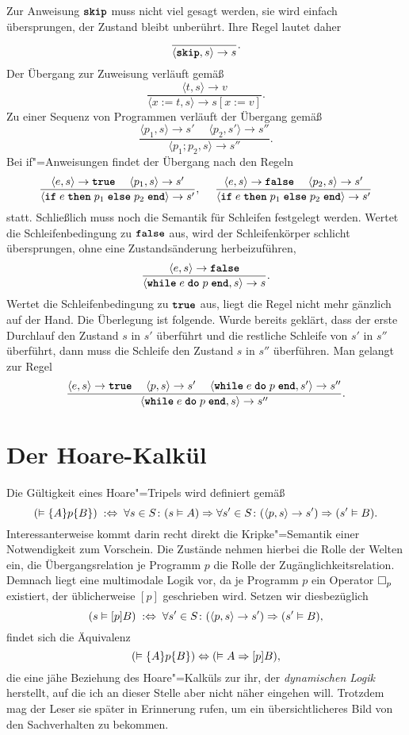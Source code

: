 Zur Anweisung $\kw{skip}$ muss nicht viel gesagt werden, sie wird einfach
übersprungen, der Zustand bleibt unberührt. Ihre Regel lautet daher
\[\dfrac{}{\langle\kw{skip},s\rangle\to s}.\]
Der Übergang zur Zuweisung verläuft gemäß
\[\dfrac{\langle t,s\rangle\to v}{\langle x:=t, s\rangle \to s[x:=v]}.\]
Zu einer Sequenz von Programmen verläuft der Übergang gemäß
\[\dfrac{\langle p_1,s\rangle\to s'\quad\;\langle p_2,s'\rangle\to s''}
{\langle p_1; p_2, s\rangle\to s''}.\]
Bei if"=Anweisungen findet der Übergang nach den Regeln
\[\dfrac{\langle e,s\rangle\to\kw{true}\quad\;\langle p_1,s\rangle\to s'}
{\langle\kw{if}\;e\;\kw{then}\;p_1\;\kw{else}\;p_2\;\kw{end}\rangle\to s'},\quad\;
\dfrac{\langle e,s\rangle\to\kw{false}\quad\;\langle p_2,s\rangle\to s'}
{\langle\kw{if}\;e\;\kw{then}\;p_1\;\kw{else}\;p_2\;\kw{end}\rangle\to s'}\]
statt. Schließlich muss noch die Semantik für Schleifen festgelegt werden.
Wertet die Schleifenbedingung zu $\kw{false}$ aus, wird der Schleifenkörper
schlicht übersprungen, ohne eine Zustandsänderung herbeizuführen,
\[\dfrac{\langle e,s\rangle\to\kw{false}}
{\langle\kw{while}\;e\;\kw{do}\;p\;\kw{end},s\rangle\to s}.\]
Wertet die Schleifenbedingung zu $\kw{true}$ aus, liegt die Regel
nicht mehr gänzlich auf der Hand. Die Überlegung ist folgende. Wurde
bereits geklärt, dass der erste Durchlauf den Zustand $s$ in $s'$
überführt und die restliche Schleife von $s'$ in $s''$ überführt,
dann muss die Schleife den Zustand $s$ in $s''$ überführen. Man gelangt
zur Regel
\[\dfrac{\langle e,s\rangle\to\kw{true}\quad\;\langle p,s\rangle\to s'\quad\;
\langle\kw{while}\;e\;\kw{do}\;p\;\kw{end},s'\rangle\to s''}
{\langle\kw{while}\;e\;\kw{do}\;p\;\kw{end},s\rangle\to s''}.\]

\section{Der Hoare-Kalkül}

Die Gültigkeit eines Hoare"=Tripels wird definiert gemäß
\[(\vDash\{A\}p\{B\})\;:\Leftrightarrow\;\forall s\in S\colon (s\vDash A)\Rightarrow\forall s'\in S\colon
(\langle p,s\rangle\to s')\Rightarrow (s'\vDash B).\]
Interessanterweise kommt darin recht direkt die Kripke"=Semantik einer
Notwendigkeit zum Vorschein. Die Zustände nehmen hierbei die Rolle der
Welten ein, die Übergangsrelation je Programm $p$ die Rolle der
Zugänglichkeitsrelation. Demnach liegt eine multimodale Logik vor, da je
Programm $p$ ein Operator $\Box_p$ existiert, der üblicherweise $[p]$
geschrieben wird. Setzen wir diesbezüglich
\[(s\vDash [p]B)\;:\Leftrightarrow\;\forall s'\in S\colon
(\langle p,s\rangle\to s')\Rightarrow (s'\vDash B),\]
findet sich die Äquivalenz
\[(\vDash\{A\}p\{B\})\Leftrightarrow (\vDash A\Rightarrow [p]B),\]
die eine jähe Beziehung des Hoare"=Kalküls zur ihr, der \emph{dynamischen Logik} herstellt, auf
die ich an dieser Stelle aber nicht näher eingehen will. Trotzdem mag der
Leser sie später in Erinnerung rufen, um ein übersichtlicheres Bild
von den Sachverhalten zu bekommen.

